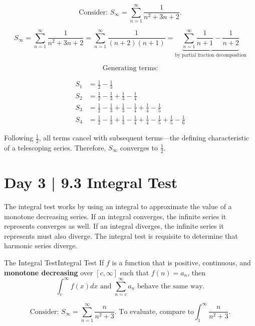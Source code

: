 \documentclass[10pt]{article}
\theoremstyle{definition}
\begin{document}
\[\text{Consider: } S_\infty=\sum_{n=1}^{\infty} \frac{1}{n^2+3n+2}.\]

\[S_\infty = \sum_{n=1}^{\infty} \frac{1}{n^2+3n+2} = \sum_{n=1}^{\infty} \frac{1}{(n+2)(n+1)}=\underbrace{\sum_{n=1}^{\infty} \frac{1}{n+1}-\frac{1}{n+2}}_{\text{by partial fraction decomposition}}\]


\newpage

\[\text{Generating terms:}\]

\begin{equation*}
\begin{split}
    S_1&=\frac{1}{2}-\frac{1}{3} \\
    S_2&=\frac{1}{2}-\frac{1}{3}+\frac{1}{3}-\frac{1}{4} \\
    S_3&=\frac{1}{2}-\frac{1}{3}+\frac{1}{3}-\frac{1}{4}+\frac{1}{4}-\frac{1}{5} \\
    S_4&=\frac{1}{2}-\frac{1}{3}+\frac{1}{3}-\frac{1}{4}+\frac{1}{4}-\frac{1}{5}+\frac{1}{5}-\frac{1}{6}
\end{split}
\end{equation*}

Following $\frac{1}{2}$, all terms cancel with subsequent terms---the defining characteristic of a telescoping series. Therefore, $S_\infty$ converges to $\frac{1}{2}$.



\section{Day 3 | 9.3 Integral Test}
The integral test works by using an integral to approximate the value of a monotone decreasing series. If an integral converges, the infinite series it represents converges as well. If an integral diverges, the infinite series it represents must also diverge. The integral test is requisite to determine that harmonic series diverge.

\begin{theorem}{The Integral Test}{Integral Test}
    If $f$ is a function that is positive, continuous, and \textbf{monotone decreasing} over $[c, \infty]$ such that $f(n)= a_n$, then
    \vspace{-0.3cm}
    \[\int_{c}^{\infty}f(x)dx \text{ and } \sum_{n=c}^{\infty} a_n \text{ behave the same way.}\]
\end{theorem}

\[\text{Consider: } S_\infty=\sum_{n=1}^{\infty} \frac{n}{n^2+3}. \text{ To evaluate, compare to} \int_{1}^{\infty} \frac{n}{n^2+3}.\]
\end{document}
